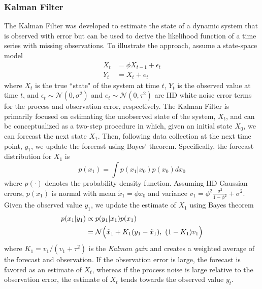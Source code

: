 \documentclass{article}
\begin{document}
\subsubsection*{Kalman Filter}

The Kalman Filter was developed to estimate the state of a dynamic system that is observed with error but can be used to derive the likelihood function of a time series with missing observations. To illustrate the approach, assume a state-space model
\begin{equation*}
    \begin{aligned}
        X_t &= \phi X_{t-1} + \epsilon_t\\
        Y_t &= X_t + e_t
    \end{aligned}
\end{equation*}
where $X_t$ is the true ``state" of the system at time $t$, $Y_t$ is the observed value at time $t$, and $\epsilon_t \sim \mathcal{N}(0, \sigma^2)$ and $e_t \sim \mathcal{N}(0, \tau^2)$ are IID white noise error terms for the process and observation error, respectively. The Kalman Filter is primarily focused on estimating the unobserved state of the system, $X_t$, and can be conceptualized as a two-step procedure in which, given an initial state $X_0$, we can forecast the next state $X_1$. Then, following data collection at the next time point, $y_1$, we update the forecast using Bayes' theorem. Specifically, the forecast distribution for $X_1$ is
\begin{equation*}
    p(x_1) = \int p(x_1 | x_0)p(x_0)dx_0
\end{equation*}
where $p(\cdot)$ denotes the probability density function. Assuming IID Gaussian errors, $p(x_1)$ is normal with mean ${\tilde x}_1 = \phi x_0$ and variance $v_1 = \phi^2 \frac{\sigma^2}{1 - \phi^2} + \sigma^2$. Given the observed value $y_1$, we update the estimate of $X_1$ using Bayes theorem
\begin{equation*}
    \begin{aligned}
        p(x_1 | y_1) &\propto p(y_1 | x_1) p(x_1)\\
        &= \mathcal{N}\Bigl(\tilde x_1 + K_1(y_1 - \tilde x_1),\ (1 - K_1)v_1 \Bigr)
    \end{aligned} 
\end{equation*}
where $K_1 = v_1 / (v_1 + \tau^2)$ is the \textit{Kalman gain} and creates a weighted average of the forecast and observation. If the observation error is large, the forecast is favored as an estimate of $X_t$, whereas if the process noise is large relative to the observation error, the estimate of $X_t$ tends towards the observed value $y_t$.
\end{document}
